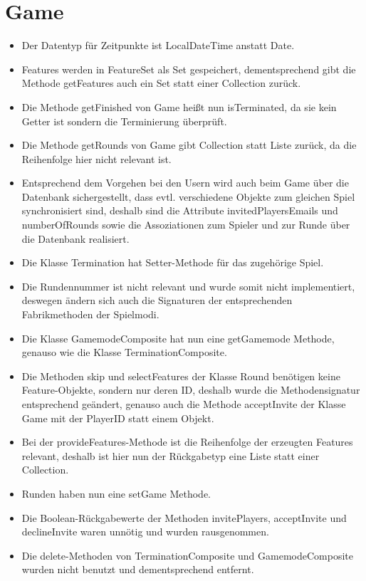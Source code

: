 \documentclass[a4paper]{scrreprt}
\begin{document}
\section{Game}
\begin{itemize}
	\item Der Datentyp für Zeitpunkte ist LocalDateTime anstatt Date.
	\item Features werden in FeatureSet als Set gespeichert, dementsprechend gibt die Methode getFeatures auch ein Set statt einer Collection zurück.
	\item Die Methode getFinished von Game heißt nun isTerminated, da sie kein Getter ist sondern die Terminierung überprüft.
	\item Die Methode getRounds von Game gibt Collection statt Liste zurück, da die Reihenfolge hier nicht relevant ist.
	\item Entsprechend dem Vorgehen bei den Usern wird auch beim Game über die Datenbank sichergestellt, dass evtl. verschiedene Objekte zum gleichen Spiel synchronisiert sind, deshalb sind die Attribute invitedPlayersEmails und numberOfRounds sowie die Assoziationen zum Spieler und zur Runde über die Datenbank realisiert.
	\item Die Klasse Termination hat Setter-Methode für das zugehörige Spiel.
	\item Die Rundennummer ist nicht relevant und wurde somit nicht implementiert, deswegen ändern sich auch die Signaturen der entsprechenden Fabrikmethoden der Spielmodi.
	\item Die Klasse GamemodeComposite hat nun eine getGamemode Methode, genauso wie die Klasse TerminationComposite.
	\item Die Methoden skip und selectFeatures der Klasse Round benötigen keine Feature-Objekte, sondern nur deren ID, deshalb wurde die Methodensignatur entsprechend geändert, genauso auch die Methode acceptInvite der Klasse Game mit der \newline PlayerID statt einem Objekt.
	\item Bei der provideFeatures-Methode ist die Reihenfolge der erzeugten Features relevant, deshalb ist hier nun der Rückgabetyp eine Liste statt einer Collection.
	\item Runden haben nun eine setGame Methode.
	\item Die Boolean-Rückgabewerte der Methoden invitePlayers, acceptInvite und declineInvite waren unnötig und wurden rausgenommen.
	\item Die delete-Methoden von TerminationComposite und GamemodeComposite wurden nicht benutzt und dementsprechend entfernt.

\end{itemize}
\end{document}
